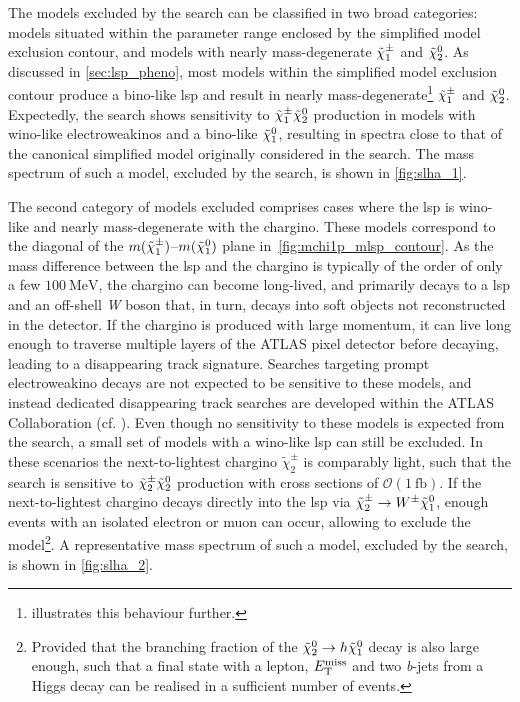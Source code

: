 The models excluded by the \onelepton search can be classified in two broad categories: models situated within the parameter range enclosed by the simplified model exclusion contour, and models with nearly mass-degenerate $\tilde{\chi}_1^\pm$ and $\tilde{\chi}_2^0$.
As discussed in \cref{sec:lsp_pheno}, most models within the simplified model exclusion contour produce a bino-like \gls{lsp} and result in nearly mass-degenerate\footnote{ illustrates this behaviour further.} $\tilde{\chi}_1^\pm$ and $\tilde{\chi}_2^0$.
Expectedly, the \onelepton search shows sensitivity to $\tilde{\chi}_1^\pm\tilde{\chi}_2^0$ production in models with wino-like electroweakinos and a bino-like $\tilde{\chi}_1^0$, resulting in spectra close to that of the canonical simplified model originally considered in the search.
The mass spectrum of such a model, excluded by the \onelepton search, is shown in \cref{fig:slha_1}.

The second category of models excluded comprises cases where the \gls{lsp} is wino-like and nearly mass-degenerate with the chargino. These models correspond to the diagonal of the $m(\tilde{\chi}_1^\pm)$--$m(\tilde{\chi}_1^0)$ plane in~\cref{fig:mchi1p_mlsp_contour}. As the mass difference between the \gls{lsp} and the chargino is typically of the order of only a few $\SI{100}{\MeV}$, the chargino can become long-lived, and primarily decays to a \gls{lsp} and an off-shell \textit{W} boson that, in turn, decays into soft objects not reconstructed in the detector.
If the chargino is produced with large momentum, it can live long enough to traverse multiple layers of the ATLAS pixel detector before decaying, leading to a disappearing track signature. Searches targeting prompt electroweakino decays are not expected to be sensitive to these models, and instead dedicated disappearing track searches are developed within the ATLAS Collaboration (cf. \cite{ATLAS-CONF-2021-015}). 
Even though no sensitivity to these models is expected from the \onelepton search, a small set of models with a wino-like \gls{lsp} can still be excluded. In these scenarios the next-to-lightest chargino $\tilde{\chi}^\pm_2$ is comparably light, such that the \onelepton search is sensitive to $\tilde{\chi}^\pm_2\tilde{\chi}_2^0$ production with cross sections of $\mathcal{O}(\SI{1}{\femto\barn})$.
If the next-to-lightest chargino decays directly into the \gls{lsp} via $\tilde{\chi}^\pm_2 \rightarrow W^\pm \tilde{\chi}_1^0$, enough events with an isolated electron or muon can occur, allowing to exclude the model\footnote{Provided that the branching fraction of the $\tilde{\chi}_2^0 \rightarrow h \tilde{\chi}_1^0$ decay is also large enough, such that a final state with a lepton, $E_{\textrm{T}}^{\textrm{miss}}$ and two \textit{b}-jets from a Higgs decay can be realised in a sufficient number of events.}. A representative mass spectrum of such a model, excluded by the \onelepton search, is shown in \cref{fig:slha_2}.

